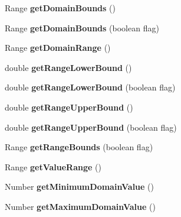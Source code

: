 \begin{DoxyCompactItemize}
\item 
Range {\bfseries get\-Domain\-Bounds} ()\label{classdesmoj_1_1extensions_1_1grafic_1_1util_1_1_time_series_data_set_adapter_a3e3ba3b1ac5df278c30ca2c29460c062}

\item 
Range {\bfseries get\-Domain\-Bounds} (boolean flag)\label{classdesmoj_1_1extensions_1_1grafic_1_1util_1_1_time_series_data_set_adapter_a60b5bebc2de67dd10192060edae7011f}

\item 
Range {\bfseries get\-Domain\-Range} ()\label{classdesmoj_1_1extensions_1_1grafic_1_1util_1_1_time_series_data_set_adapter_a2338366d687ef03f435e28a2910e5798}

\item 
double {\bfseries get\-Range\-Lower\-Bound} ()\label{classdesmoj_1_1extensions_1_1grafic_1_1util_1_1_time_series_data_set_adapter_aac9ed1d6cda0d1e593c554401aaf35a7}

\item 
double {\bfseries get\-Range\-Lower\-Bound} (boolean flag)\label{classdesmoj_1_1extensions_1_1grafic_1_1util_1_1_time_series_data_set_adapter_aa39ea654ddbc3705b550af21869959c6}

\item 
double {\bfseries get\-Range\-Upper\-Bound} ()\label{classdesmoj_1_1extensions_1_1grafic_1_1util_1_1_time_series_data_set_adapter_a49d281c58c9b203a6630ad0242b1f388}

\item 
double {\bfseries get\-Range\-Upper\-Bound} (boolean flag)\label{classdesmoj_1_1extensions_1_1grafic_1_1util_1_1_time_series_data_set_adapter_afb976e465fc9505c9aea786228c06684}

\item 
Range {\bfseries get\-Range\-Bounds} (boolean flag)\label{classdesmoj_1_1extensions_1_1grafic_1_1util_1_1_time_series_data_set_adapter_a83387f4153f4ba1fc5403b01ac14d670}

\item 
Range {\bfseries get\-Value\-Range} ()\label{classdesmoj_1_1extensions_1_1grafic_1_1util_1_1_time_series_data_set_adapter_a3d6e9d5bd6846690703d1f66e28f77ef}

\item 
Number {\bfseries get\-Minimum\-Domain\-Value} ()\label{classdesmoj_1_1extensions_1_1grafic_1_1util_1_1_time_series_data_set_adapter_a8c1952965e489202a25151296c4cf918}

\item 
Number {\bfseries get\-Maximum\-Domain\-Value} ()\label{classdesmoj_1_1extensions_1_1grafic_1_1util_1_1_time_series_data_set_adapter_aaddb936307b6350ed3cdb2ce43bbe3e0}


\end{DoxyCompactItemize}
